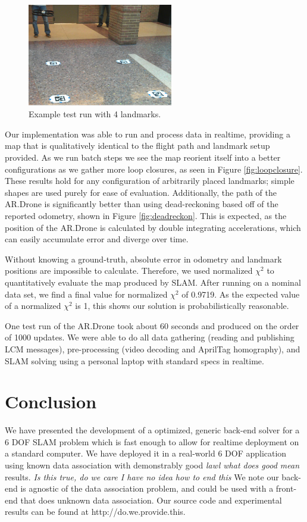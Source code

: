 \documentclass[conference]{IEEEtran}
\begin{document}
\begin{figure}[H]
\centering
\includegraphics[width=2.5in]{images/setup}
\caption{Example test run with 4 landmarks.}
\label{fig:testing}
\end{figure}

Our implementation was able to run and process data in realtime, providing a map that is
qualitatively identical to the flight path and landmark setup provided.  As we run batch
steps we see the map reorient itself into a better configurations as we gather more loop
closures, as seen in Figure \ref{fig:loopclosure}. These results hold for any configuration 
of arbitrarily placed landmarks; simple shapes are used purely for ease of evaluation. Additionally, the path of
the AR.Drone is significantly better than using dead-reckoning based off of the reported
odometry, shown in Figure \ref{fig:deadreckon}.  This is expected, as the position of the AR.Drone is calculated by double
integrating accelerations, which can easily accumulate error and diverge over time.

Without knowing a ground-truth, absolute error in odometry and landmark positions are impossible to calculate.  Therefore, we used normalized $\chi^2$ to quantitatively evaluate the map produced by SLAM.  After running on a nominal data set, we find a final value for normalized $\chi^2$ of 0.9719.  As the expected value of a normalized $\chi^2$ is 1, this shows our solution is probabilistically reasonable. 

One test run of the AR.Drone took about 60 seconds and produced on the order of 1000
updates. We were able to do all data gathering (reading and publishing LCM messages),
pre-processing (video decoding and AprilTag homography), and SLAM solving using a personal
laptop with standard specs in realtime.


\section{Conclusion}
\label{sec:conclusion}

We have presented the development of a optimized, generic back-end solver for a 6 DOF SLAM
problem which is fast enough to allow for realtime deployment on a standard computer.  We
have deployed it in a real-world 6 DOF application using known data association with
demonstrably good \emph{ lawl what does good mean} results.  \emph{Is this true, do we
  care I have no idea how to end this} We note our back-end is agnostic of the data
association problem, and could be used with a front-end that does unknown data
association.  Our source code and experimental results can be found at
http://do.we.provide.this.
\end{document}
